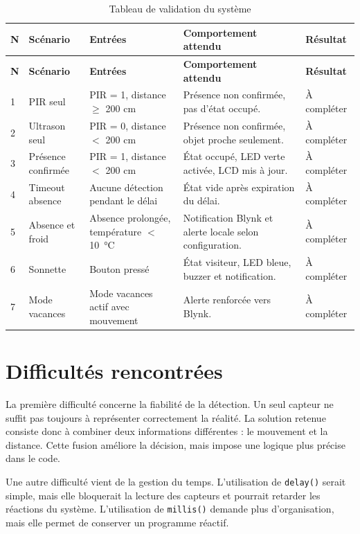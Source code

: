 \documentclass[12pt,a4paper]{report}
\begin{document}
\begin{longtable}{p{1cm}p{3.2cm}p{4.1cm}p{4.4cm}p{2.2cm}}
  \caption{Tableau de validation du système}\\
  \toprule
  \rowcolor{TableHead}
  \textbf{N} & \textbf{Scénario} & \textbf{Entrées} & \textbf{Comportement attendu} & \textbf{Résultat} \\
  \midrule
  \endfirsthead
  \toprule
  \rowcolor{TableHead}
  \textbf{N} & \textbf{Scénario} & \textbf{Entrées} & \textbf{Comportement attendu} & \textbf{Résultat} \\
  \midrule
  \endhead
  1 & PIR seul & PIR = 1, distance $\geq$ 200 cm & Présence non confirmée, pas d'état occupé. & À compléter \\
  2 & Ultrason seul & PIR = 0, distance $<$ 200 cm & Présence non confirmée, objet proche seulement. & À compléter \\
  3 & Présence confirmée & PIR = 1, distance $<$ 200 cm & État occupé, LED verte activée, LCD mis à jour. & À compléter \\
  4 & Timeout absence & Aucune détection pendant le délai & État vide après expiration du délai. & À compléter \\
  5 & Absence et froid & Absence prolongée, température $<$ 10~°C & Notification Blynk et alerte locale selon configuration. & À compléter \\
  6 & Sonnette & Bouton pressé & État visiteur, LED bleue, buzzer et notification. & À compléter \\
  7 & Mode vacances & Mode vacances actif avec mouvement & Alerte renforcée vers Blynk. & À compléter \\
  \bottomrule
\end{longtable}

\chapter{Difficultés rencontrées}
La première difficulté concerne la fiabilité de la détection. Un seul capteur ne suffit pas toujours à représenter correctement la réalité. La solution retenue consiste donc à combiner deux informations différentes : le mouvement et la distance. Cette fusion améliore la décision, mais impose une logique plus précise dans le code.

Une autre difficulté vient de la gestion du temps. L'utilisation de \texttt{delay()} serait simple, mais elle bloquerait la lecture des capteurs et pourrait retarder les réactions du système. L'utilisation de \texttt{millis()} demande plus d'organisation, mais elle permet de conserver un programme réactif.
\end{document}
